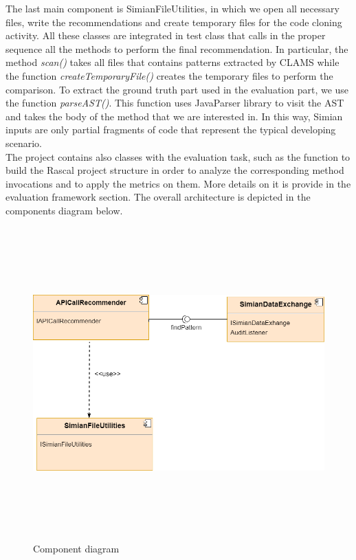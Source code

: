 The last main component is SimianFileUtilities, in which we open all necessary files, write the recommendations and create temporary files for the code cloning activity. All these classes are integrated in test class that calls in the proper sequence all the methods to perform the final recommendation. In particular, the method \textit{scan()} takes all files that contains patterns extracted by CLAMS while the function \textit{createTemporaryFile()} creates the temporary files to perform the comparison. To extract the ground truth part used in the evaluation part, we use the function \textit{parseAST()}. This function uses JavaParser library to visit the AST and takes the body of the method that we are interested in. In this way, Simian inputs are only partial fragments of code that represent the typical developing scenario. \\
The project contains also classes with the evaluation task, such as the function to build the Rascal project structure in order to analyze the corresponding method invocations and to apply the metrics on them. More details on it is provide in the evaluation framework section. 
The overall architecture is depicted in the components diagram below.
\begin{figure}[H]
\includegraphics[width=12cm,height=12cm,keepaspectratio]{images/Component.png}
\centering
\caption{Component diagram}
\label{fig:cmd}
\end{figure}

